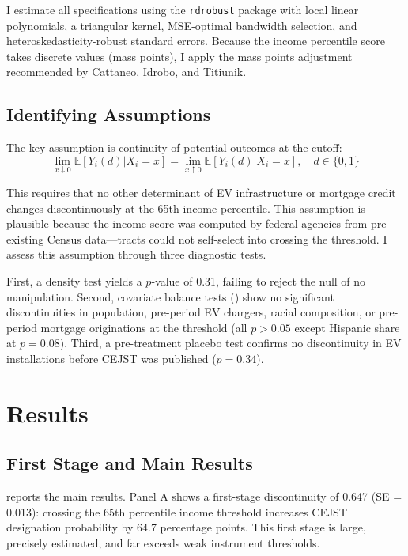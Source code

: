 \documentclass[12pt]{article}
\newcommand{\E}{\mathbb{E}}
\begin{document}
I estimate all specifications using the \texttt{rdrobust} package \citep{cattaneo2014rdrobust, cattaneo2020practical} with local linear polynomials, a triangular kernel, MSE-optimal bandwidth selection, and heteroskedasticity-robust standard errors. Because the income percentile score takes discrete values (mass points), I apply the mass points adjustment recommended by Cattaneo, Idrobo, and Titiunik.

\subsection{Identifying Assumptions}

The key assumption is continuity of potential outcomes at the cutoff:
\begin{equation}
\lim_{x \downarrow 0} \E[Y_i(d) | X_i = x] = \lim_{x \uparrow 0} \E[Y_i(d) | X_i = x], \quad d \in \{0,1\}
\end{equation}

This requires that no other determinant of EV infrastructure or mortgage credit changes discontinuously at the 65th income percentile. This assumption is plausible because the income score was computed by federal agencies from pre-existing Census data---tracts could not self-select into crossing the threshold. I assess this assumption through three diagnostic tests.

First, a density test \citep{cattaneo2020density} yields a $p$-value of 0.31, failing to reject the null of no manipulation. Second, covariate balance tests () show no significant discontinuities in population, pre-period EV chargers, racial composition, or pre-period mortgage originations at the threshold (all $p > 0.05$ except Hispanic share at $p = 0.08$). Third, a pre-treatment placebo test confirms no discontinuity in EV installations before CEJST was published ($p = 0.34$).

\section{Results}

\subsection{First Stage and Main Results}



 reports the main results. Panel A shows a first-stage discontinuity of 0.647 (SE = 0.013): crossing the 65th percentile income threshold increases CEJST designation probability by 64.7 percentage points. This first stage is large, precisely estimated, and far exceeds weak instrument thresholds.
\end{document}
